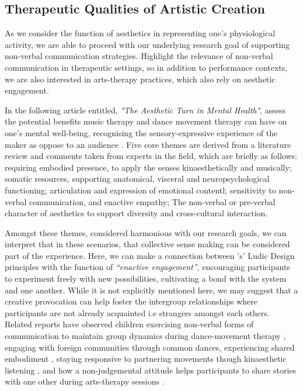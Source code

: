 \subsection{Therapeutic Qualities of Artistic Creation}

As we consider the function of aesthetics in representing one's physiological activity, we are able to proceed with our underlying research goal of supporting non-verbal communication strategies. Highlight the relevance of non-verbal communication in therapeutic settings, so in addition to performance contexts, we are also interested in arts-therapy practices, which also rely on aesthetic engagement.

In the following article entitled, \textit{"The Aesthetic Turn in Mental Health"}, \citeauthor{samaritter_aesthetic_2018} assess the potential benefits music therapy and dance movement therapy can have on one's mental well-being, recognising the sensory-expressive experience of the maker as oppose to an audience \cite{samaritter_aesthetic_2018}. Five core themes are derived from a literature review and comments taken from experts in the field, which are briefly as follows: requiring embodied presence, to apply the senses kinaesthetically and musically; somatic resources, supporting anatomical, visceral and neuropsychological functioning; articulation and expression of emotional contentl; sensitivity to non-verbal communication, and enactive empathy; The non-verbal or pre-verbal character of aesthetics to support diversity and cross-cultural interaction.

Amongst these themes, considered harmonious with our research goals, we can interpret that in these scenarios, that collective sense making can be considered part of the experience. Here, we can make a connection between \citeauthor{gaver_drift_2004}'s' Ludic Design principles \cite{gaver_drift_2004} with the function of \textit{``enactive engagement''}, encouraging participants to experiment freely with new possibilities, cultivating a bond with the system and one another. While it is not explicitly mentioned here, we may suggest that a creative provocation can help foster the intergroup relationships where participants are not already acquainted i.e strangers amongst each others. Related reports have observed children exercising non-verbal forms of communication to maintain group dynamics during dance-movement therapy \cite{ylonen_kinaesthetic_2009}, engaging with foreign communities through common dances, experiencing shared embodiment \cite{hoppu_other_2013}, staying responsive to partnering movements though kinaesthetic listening \cite{ylonen_bodily_2003}, and how a non-judgemental attitude helps participants to share stories with one other during arts-therapy sessions \cite{kalmanowitz_out_2016}.

